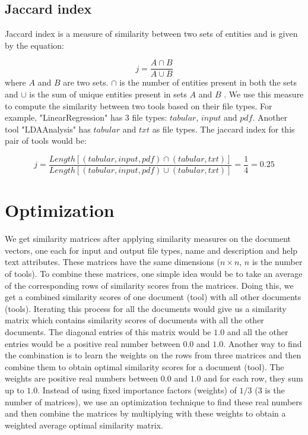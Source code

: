 \subsection{Jaccard index}
Jaccard index is a measure of similarity between two sets of entities and is given by the equation:

\begin{equation}
j = \frac{A \cap B}{A \cup B}
\end{equation}
where $A$ and $B$ are two sets. $\cap$ is the number of entities present in both the sets and $\cup$ is the sum of unique entities present in sets $A$ and $B$ \cite{Ivchenko1998}. We use this measure to compute the similarity between two tools based on their file types. For example, "LinearRegression" has 3 file types: $tabular$, $input$ and $pdf$. Another tool "LDAAnalysis" has $tabular$ and $txt$ as file types. The jaccard index for this pair of tools would be:

\begin{equation}
j = \frac{Length[(tabular, input, pdf) \cap (tabular, txt)]}{Length[(tabular, input, pdf) \cup (tabular, txt)]} = \frac{1}{4} = 0.25
\end{equation}

\section{Optimization}
We get similarity matrices after applying similarity measures on the document vectors, one each for input and output file types, name and description and help text attributes. These matrices have the same dimensions ($n \times n$, $n$ is the number of tools).  To combine these matrices, one simple idea would be to take an average of the corresponding rows of similarity scores from the matrices. Doing this, we get a combined similarity scores of one document (tool) with all other documents (tools). Iterating this process for all the documents would give us a similarity matrix which contains similarity scores of documents with all the other documents. The diagonal entries of this matrix would be $1.0$ and all the other entries would be a positive real number between $0.0$ and $1.0$. Another way to find the combination is to learn the weights on the rows from three matrices and then combine them to obtain optimal similarity scores for a document (tool). The weights are positive real numbers between $0.0$ and $1.0$ and for each row, they sum up to $1.0$. Instead of using fixed importance factors (weights) of $1/3$ ($3$ is the number of matrices), we use an optimization technique to find these real numbers and then combine the matrices by multiplying with these weights to obtain a weighted average optimal similarity matrix.

